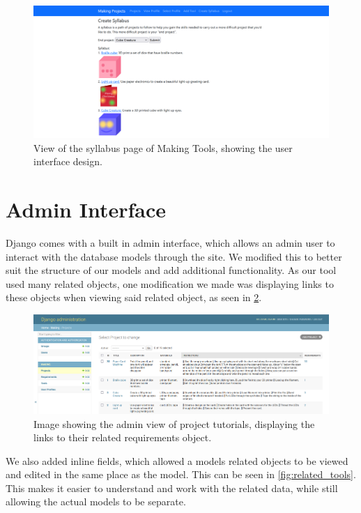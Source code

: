 \documentclass{l4proj}
\begin{document}
\begin{figure}[htb]
    \centering
    \includegraphics[width=\linewidth]{images/syllabus.png}    

    \caption{View of the syllabus page of Making Tools, showing the user interface design. 
    }
    \label{fig:syllabus} 
\end{figure}

\section{Admin Interface}
Django comes with a built in admin interface, which allows an admin user to interact with the database models through the site. We modified this to better suit the structure of our models and add additional functionality. As our tool used many related objects, one modification we made was displaying links to these objects when viewing said related object, as seen in \ref{fig:project_admin}. 

\begin{figure}[htb]
    \centering
    \includegraphics[width=\linewidth]{images/project_admin_2.png}    

    \caption{Image showing the admin view of project tutorials, displaying the links to their related requirements object.
    }
    \label{fig:project_admin} 
\end{figure}

We also added inline fields, which allowed a models related objects to be viewed and edited in the same place as the model. This can be seen in \ref{fig:related_tools}. This makes it easier to understand and work with the related data, while still allowing the actual models to be separate. 
\end{document}
